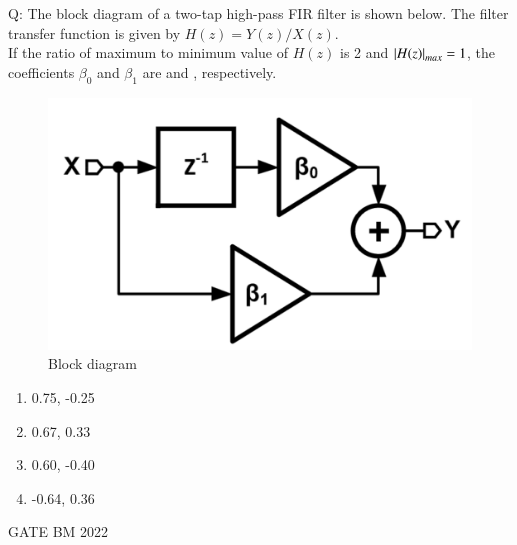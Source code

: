\documentclass[journal,12pt,onecolumn]{IEEEtran}
\theoremstyle{remark}
\begin{document}
\let\vec\mathbf







\bigskip


Q:  The block diagram of a two-tap high-pass FIR filter is shown below. The filter transfer function is given by $H(z) = Y(z)/X(z)$.\\
If the ratio of maximum to minimum value of $H(z)$ is 2 and $\left\vert H(z)\right\vert_{max} = 1$, the coefficients $\beta_0$ and $\beta_1$ are \underline{\hspace{3cm}} and \underline{\hspace{3cm}}, respectively. 

\begin{figure}[H]
    \centering
    \includegraphics[width=0.5\linewidth]{figs/qfig.png} 
    \caption{Block diagram}
    \label{fig:GATE22BM39.1}
\end{figure}


\begin{enumerate}[label=(\Alph*)]
\item 0.75, -0.25
\item 0.67, 0.33
\item 0.60, -0.40
\item -0.64, 0.36
\end{enumerate}
\hfill{GATE BM 2022}


\solution \\
\end{document}
